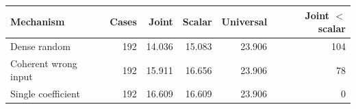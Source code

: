 \begin{tabular}{lrrrrr}\toprule
Mechanism & Cases & Joint & Scalar & Universal & Joint $<$ scalar\\\midrule
Dense random & 192 & 14.036 & 15.083 & 23.906 & 104 \\
Coherent wrong input & 192 & 15.911 & 16.656 & 23.906 & 78 \\
Single coefficient & 192 & 16.609 & 16.609 & 23.906 & 0 \\
\bottomrule\end{tabular}
